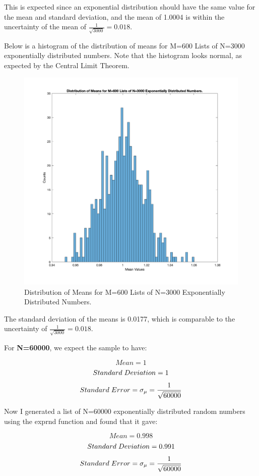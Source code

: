 \documentclass{article}
\begin{document}
   This is expected since an exponential distribution should have the same value for the mean and standard deviation, and the mean of 1.0004 is within the uncertainty of the mean of $\frac{1}{\sqrt{3000}}=0.018$.
   
   Below is a histogram of the distribution of means for M=600 Lists of N=3000 exponentially distributed numbers. Note that the histogram looks normal, as expected by the Central Limit Theorem.
   
    \begin{figure}[H]
  \centering
  \includegraphics[width=0.8\linewidth]{lateximages/Prob4_4_3000.png}
  \caption{Distribution of Means for M=600 Lists of N=3000 Exponentially Distributed Numbers.}
  \label{fig:boat1}
  \end{figure}
  
  The standard deviation of the means is 0.0177, which is comparable to the uncertainty of $\frac{1}{\sqrt{3000}}=0.018$. \newline
  
  For \textbf{N=60000}, we expect the sample to have:
 
 \[ Mean=1\]
  \[ Standard\hspace{1mm}Deviation=1\]
   \[ Standard\hspace{1mm}Error=\sigma_{\mu}=\frac{1}{\sqrt{60000}}\] 

  
  Now I generated a list of N=60000 exponentially distributed random numbers using the exprnd function and found that it gave:

 \[ Mean=0.998\]
  \[ Standard\hspace{1mm}Deviation=0.991\]
   \[ Standard\hspace{1mm}Error=\sigma_{\mu}=\frac{1}{\sqrt{60000}}\] 
   
\end{document}
